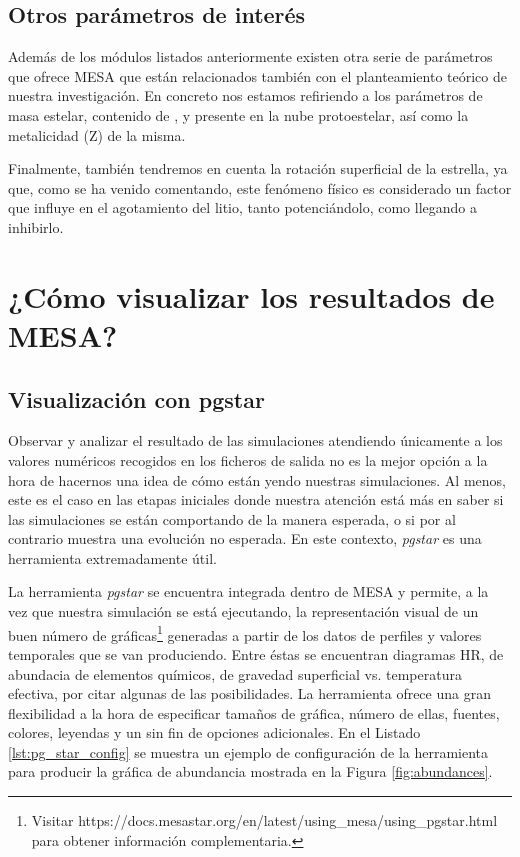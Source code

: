 \subsection{Otros parámetros de interés}
Además de los módulos listados anteriormente existen otra serie de parámetros que ofrece MESA que están relacionados también con el planteamiento teórico de nuestra investigación. En concreto nos estamos refiriendo a los parámetros de masa estelar, contenido de ,  y  presente en la nube protoestelar, así como la metalicidad (Z) de la misma.\par
 
Finalmente, también tendremos en cuenta la rotación superficial de la estrella, ya que, como se ha venido comentando, este fenómeno físico es considerado un factor que influye en el agotamiento del litio, tanto potenciándolo, como llegando a inhibirlo.\par

\section{¿Cómo visualizar los resultados de MESA?}
\subsection{Visualización con pgstar}
Observar y analizar el resultado de las simulaciones atendiendo únicamente a los valores numéricos recogidos en los ficheros de salida no es la mejor opción a la hora de hacernos una idea de cómo están yendo nuestras simulaciones. Al menos, este es el caso en las etapas iniciales donde nuestra atención está más en saber si las simulaciones se están comportando de la manera esperada, o si por al contrario muestra una evolución no esperada. En este contexto, \textit{pgstar} es una herramienta extremadamente útil.

La herramienta \textit{pgstar} se encuentra integrada dentro de MESA y permite, a la vez que nuestra simulación se está ejecutando, la representación visual de un buen número de gráficas\footnote{Visitar https://docs.mesastar.org/en/latest/using\_mesa/using\_pgstar.html para obtener información complementaria.} generadas a partir de los datos de perfiles y valores temporales que se van produciendo. Entre éstas se encuentran diagramas HR, de abundacia de elementos químicos, de gravedad superficial vs. temperatura efectiva, por citar algunas de las posibilidades. La herramienta ofrece una gran flexibilidad a la hora de especificar tamaños de gráfica, número de ellas, fuentes, colores, leyendas y un sin fin de opciones adicionales. En el Listado \ref{lst:pg_star_config} se muestra un ejemplo de configuración de la herramienta para producir la gráfica de abundancia mostrada en la Figura \ref{fig:abundances}.


